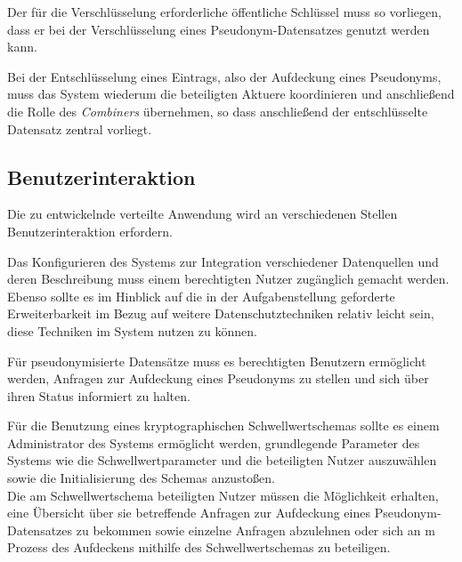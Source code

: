 Der für die Verschlüsselung erforderliche öffentliche Schlüssel muss so vorliegen, dass er bei der Verschlüsselung eines Pseudonym-Datensatzes genutzt werden kann.

Bei der Entschlüsselung eines Eintrags, also der Aufdeckung eines Pseudonyms, muss das System wiederum die beteiligten Aktuere koordinieren und anschließend die Rolle des \textit{Combiners} übernehmen, so dass anschließend der entschlüsselte Datensatz zentral vorliegt.

\subsection{Benutzerinteraktion}

\label{subsec_impl_requirements_userinteraction}




Die zu entwickelnde verteilte Anwendung wird an verschiedenen Stellen Benutzerinteraktion erfordern.

Das Konfigurieren des Systems zur Integration verschiedener Datenquellen und deren Beschreibung muss einem berechtigten Nutzer zugänglich gemacht werden. Ebenso sollte es im Hinblick auf die in der Aufgabenstellung geforderte Erweiterbarkeit im Bezug auf weitere Datenschutztechniken relativ leicht sein, diese Techniken im System nutzen zu können. 

Für pseudonymisierte Datensätze muss es berechtigten Benutzern ermöglicht werden, Anfragen zur Aufdeckung eines Pseudonyms zu stellen und sich über ihren Status informiert zu halten.

Für die Benutzung eines kryptographischen Schwellwertschemas sollte es einem Administrator des Systems ermöglicht werden, grundlegende Parameter des Systems wie die Schwellwertparameter und die beteiligten Nutzer auszuwählen sowie die Initialisierung des Schemas anzustoßen. \\
Die am Schwellwertschema beteiligten Nutzer müssen die Möglichkeit erhalten, eine Übersicht über sie betreffende Anfragen zur Aufdeckung eines Pseudonym-Datensatzes zu bekommen sowie einzelne Anfragen abzulehnen oder sich an m Prozess des Aufdeckens mithilfe des Schwellwertschemas zu beteiligen. 

